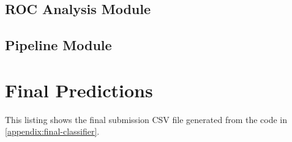 \documentclass[journal]{IEEEtran}
\begin{document}


\subsection{ROC Analysis Module}


\subsection{Pipeline Module}


\section{Final Predictions}
This listing shows the final submission CSV file generated from the code in \ref{appendix:final-classifier}.  




%
%


\ifCLASSOPTIONcaptionsoff
  \newpage
\fi





%
%
%
\end{document}
